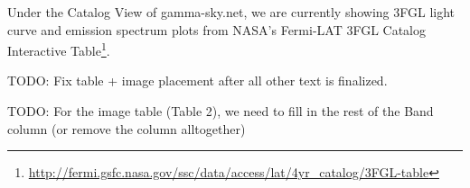 Under the Catalog View of gamma-sky.net, we are currently showing 3FGL light curve and emission spectrum plots from NASA's Fermi-LAT 3FGL Catalog Interactive Table\footnote[4]{\url{http://fermi.gsfc.nasa.gov/ssc/data/access/lat/4yr_catalog/3FGL-table}}.

TODO: Fix table + image placement after all other text is finalized.

TODO: For the image table (Table 2), we need to fill in the rest of the Band column (or remove the column alltogether)
